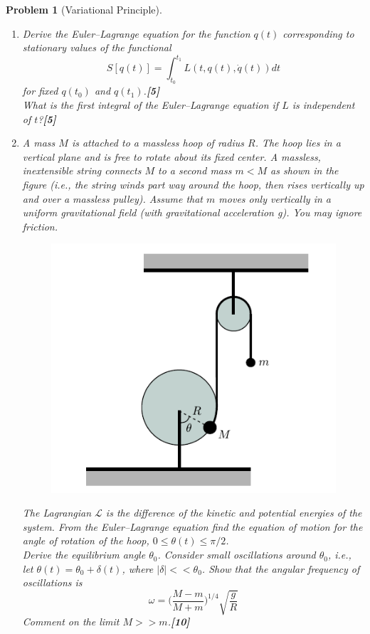 \documentclass[a4paper]{article}
\theoremstyle{new}
\newtheorem{qns}{Problem}[section]
\begin{document}
\begin{qns}[Variational Principle]\leavevmode
\begin{enumerate}[label=(\roman*)]
\item Derive the Euler–Lagrange equation for the function $q(t)$ corresponding to stationary
values of the functional
$$S[q(t)]=\int_{t_0}^{t_1}L(t,q(t),\dot{q}(t))dt$$
for fixed $q(t_0)$ and $q(t_1)$.\hfill \textbf{[5]}\\[5pt]
What is the first integral of the Euler–Lagrange equation if $L$ is independent of $t$?\hfill \textbf{[5]}
\item A mass $M$ is attached to a massless hoop of radius $R$. The hoop lies in a vertical plane and is free to rotate about its fixed center. A massless, inextensible string connects $M$ to a second mass $m < M$ as shown in the figure (i.e., the string winds part way around the hoop, then rises vertically up and over a massless pulley). Assume that $m$ moves only vertically in a uniform gravitational field (with gravitational acceleration g). You may ignore friction.
\begin{figure}[H]
    \centering
    \includegraphics[width=\linewidth]{2014P1Q9.PNG}
\end{figure}
The Lagrangian $\mathcal{L}$ is the difference of the kinetic and potential energies of the system. From the Euler–Lagrange equation find the equation of motion for the angle of rotation of the hoop, $0\leq\theta(t)\leq\pi/2$.\\[5pt]
Derive the equilibrium angle $\theta_0$. Consider small oscillations around $\theta_0$, i.e., let
$\theta(t)=\theta_0+\delta(t)$, where $|\delta|<<\theta_0$. Show that the angular frequency of oscillations is
$$\omega=\bigg(\frac{M-m}{M+m}\bigg)^{1/4}\sqrt{\frac{g}{R}}$$
Comment on the limit $M>> m$.\hfill \textbf{[10]}
\end{enumerate}
\end{qns}
\end{document}
